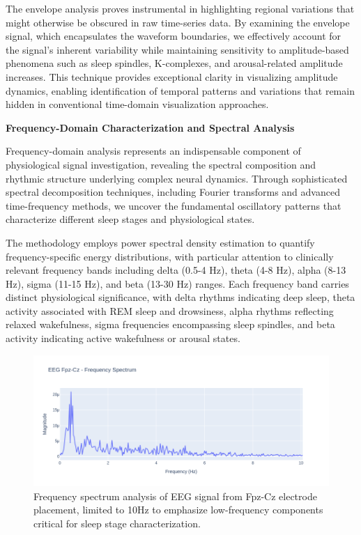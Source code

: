 \documentclass[a4paper,12pt,twoside]{article}
\begin{document}
The envelope analysis proves instrumental in highlighting regional variations that might otherwise be obscured in raw time-series data. By examining the envelope signal, which encapsulates the waveform boundaries, we effectively account for the signal's inherent variability while maintaining sensitivity to amplitude-based phenomena such as sleep spindles, K-complexes, and arousal-related amplitude increases. This technique provides exceptional clarity in visualizing amplitude dynamics, enabling identification of temporal patterns and variations that remain hidden in conventional time-domain visualization approaches.

\textbf{Frequency-Domain Characterization and Spectral Analysis}

Frequency-domain analysis represents an indispensable component of physiological signal investigation, revealing the spectral composition and rhythmic structure underlying complex neural dynamics. Through sophisticated spectral decomposition techniques, including Fourier transforms and advanced time-frequency methods, we uncover the fundamental oscillatory patterns that characterize different sleep stages and physiological states.

The methodology employs power spectral density estimation to quantify frequency-specific energy distributions, with particular attention to clinically relevant frequency bands including delta (0.5-4 Hz), theta (4-8 Hz), alpha (8-13 Hz), sigma (11-15 Hz), and beta (13-30 Hz) ranges. Each frequency band carries distinct physiological significance, with delta rhythms indicating deep sleep, theta activity associated with REM sleep and drowsiness, alpha rhythms reflecting relaxed wakefulness, sigma frequencies encompassing sleep spindles, and beta activity indicating active wakefulness or arousal states.

\begin{figure}[h]
  \centering
  \includegraphics[width=0.9\linewidth]{img/frequency spectrum eeg Fpz-Cz}
  \caption{Frequency spectrum analysis of EEG signal from Fpz-Cz electrode placement, limited to 10Hz to emphasize low-frequency components critical for sleep stage characterization.}
  \label{fig:freq_spectrum_fpz_cz}
\end{figure}
\end{document}
